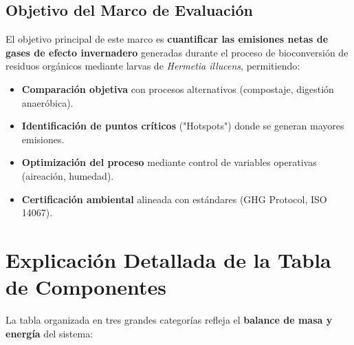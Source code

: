 \documentclass[12pt]{article}
\begin{document}
\subsection{Objetivo del Marco de Evaluación}

El objetivo principal de este marco es \textbf{cuantificar las emisiones netas de gases de efecto invernadero} generadas durante el proceso de bioconversión de residuos orgánicos mediante larvas de \textit{Hermetia illucens}, permitiendo:

\begin{itemize}
    \item \textcolor{concepto}{\textbf{Comparación objetiva}} con procesos alternativos (compostaje, digestión anaeróbica).
    \item \textcolor{concepto}{\textbf{Identificación de puntos críticos}} ("Hotspots") donde se generan mayores emisiones.
    \item \textcolor{concepto}{\textbf{Optimización del proceso}} mediante control de variables operativas (aireación, humedad).
    \item \textcolor{concepto}{\textbf{Certificación ambiental}} alineada con estándares (GHG Protocol, ISO 14067).
\end{itemize}

\section{Explicación Detallada de la Tabla de Componentes}

La tabla organizada en tres grandes categorías refleja el \textbf{balance de masa y energía} del sistema:
\end{document}
